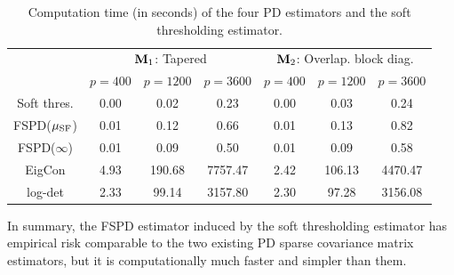 \documentclass[times,sort&compress,3p]{elsarticle}
\begin{document}
\begin{table}[htb!]
\begin{center}
\begin{tabular}{c|ccc|ccc}
\hline
&  \multicolumn{3}{c|}{${\bf M}_1$: Tapered}& \multicolumn{3}{c}{${\bf M}_2$: Overlap. block diag.} \\
 & $p=400$ & $p=1200$ & $p=3600$ & $p=400$ & $p=1200$ & $p=3600$ \\
 \hline
Soft thres. & 0.00  & 0.02  &0.23  &0.00 &0.03 &0.24  \\
FSPD($\mu_{\rm SF}$) & 0.01 & 0.12  & 0.66 & 0.01 & 0.13 & 0.82 \\
FSPD($\infty$) & 0.01 & 0.09  & 0.50 & 0.01 & 0.09 & 0.58 \\
EigCon  & 4.93 & 190.68  & 7757.47 & 2.42 & 106.13 & 4470.47 \\
log-det & 2.33 & 99.14  & 3157.80 & 2.30 & 97.28 & 3156.08 \\
\hline
\end{tabular}
\caption{Computation time (in seconds) of the four PD estimators and the soft thresholding
estimator.}
\label{table:timecomp}
\end{center}
\end{table}

In summary, the FSPD estimator induced by the soft thresholding estimator has empirical risk 
comparable to the two existing PD sparse covariance matrix estimators, but it is computationally 
much faster and simpler than them.
\end{document}
